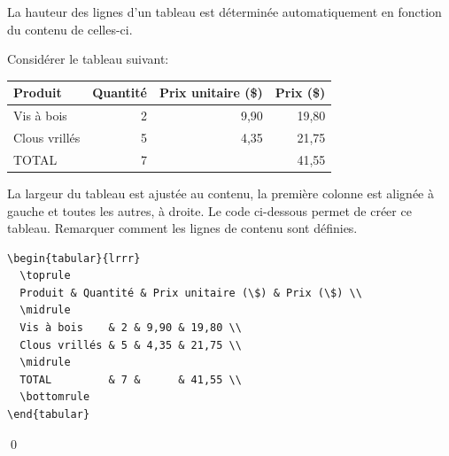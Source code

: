 La hauteur des lignes d'un tableau est déterminée automatiquement en
fonction du contenu de celles-ci.

\begin{exemple}
  \label{exemple:tableaux:tabular:1}
  Considérer le tableau suivant:
  \begin{center}
    \begin{tabular}{lrrr}
      \toprule
      Produit & Quantité & Prix unitaire (\$) & Prix (\$) \\
      \midrule
      Vis à bois    & 2 & 9,90 & 19,80 \\
      Clous vrillés & 5 & 4,35 & 21,75 \\
      \midrule
      TOTAL         & 7 &      & 41,55 \\
      \bottomrule
    \end{tabular}
  \end{center}
  La largeur du tableau est ajustée au contenu, la première colonne
  est alignée à gauche et toutes les autres, à droite. Le code
  ci-dessous permet de créer ce tableau. Remarquer comment les lignes
  de contenu sont définies.
\begin{lstlisting}
\begin{tabular}{lrrr}
  \toprule
  Produit & Quantité & Prix unitaire (\$) & Prix (\$) \\
  \midrule
  Vis à bois    & 2 & 9,90 & 19,80 \\
  Clous vrillés & 5 & 4,35 & 21,75 \\
  \midrule
  TOTAL         & 7 &      & 41,55 \\
  \bottomrule
\end{tabular}
\end{lstlisting}
  \qed
\end{exemple}

